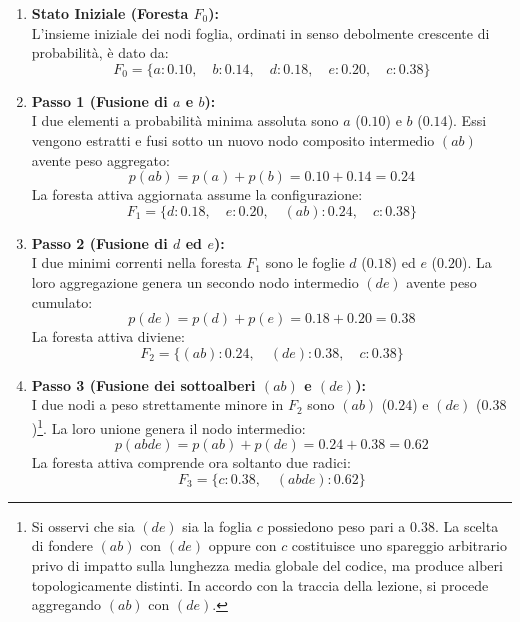 \begin{enumerate}
  \item \textbf{Stato Iniziale (Foresta $F_0$):}\\
  L'insieme iniziale dei nodi foglia, ordinati in senso debolmente crescente di probabilit\`a, \`e dato da:
  \begin{equation}
    F_0 = \{a: 0.10, \quad b: 0.14, \quad d: 0.18, \quad e: 0.20, \quad c: 0.38\}
  \end{equation}

  \item \textbf{Passo 1 (Fusione di $a$ e $b$):}\\
  I due elementi a probabilit\`a minima assoluta sono $a$ ($0.10$) e $b$ ($0.14$). Essi vengono estratti e fusi sotto un nuovo nodo composito intermedio $(ab)$ avente peso aggregato:
  \begin{equation}
    p(ab) = p(a) + p(b) = 0.10 + 0.14 = 0.24
  \end{equation}
  La foresta attiva aggiornata assume la configurazione:
  \begin{equation}
    F_1 = \{d: 0.18, \quad e: 0.20, \quad (ab): 0.24, \quad c: 0.38\}
  \end{equation}

  \item \textbf{Passo 2 (Fusione di $d$ ed $e$):}\\
  I due minimi correnti nella foresta $F_1$ sono le foglie $d$ ($0.18$) ed $e$ ($0.20$). La loro aggregazione genera un secondo nodo intermedio $(de)$ avente peso cumulato:
  \begin{equation}
    p(de) = p(d) + p(e) = 0.18 + 0.20 = 0.38
  \end{equation}
  La foresta attiva diviene:
  \begin{equation}
    F_2 = \{(ab): 0.24, \quad (de): 0.38, \quad c: 0.38\}
  \end{equation}

  \item \textbf{Passo 3 (Fusione dei sottoalberi $(ab)$ e $(de)$):}\\
  I due nodi a peso strettamente minore in $F_2$ sono $(ab)$ ($0.24$) e $(de)$ ($0.38$)\footnote{Si osservi che sia $(de)$ sia la foglia $c$ possiedono peso pari a $0.38$. La scelta di fondere $(ab)$ con $(de)$ oppure con $c$ costituisce uno spareggio arbitrario privo di impatto sulla lunghezza media globale del codice, ma produce alberi topologicamente distinti. In accordo con la traccia della lezione, si procede aggregando $(ab)$ con $(de)$.}. La loro unione genera il nodo intermedio:
  \begin{equation}
    p(abde) = p(ab) + p(de) = 0.24 + 0.38 = 0.62
  \end{equation}
  La foresta attiva comprende ora soltanto due radici:
  \begin{equation}
    F_3 = \{c: 0.38, \quad (abde): 0.62\}
  \end{equation}


\end{enumerate}
